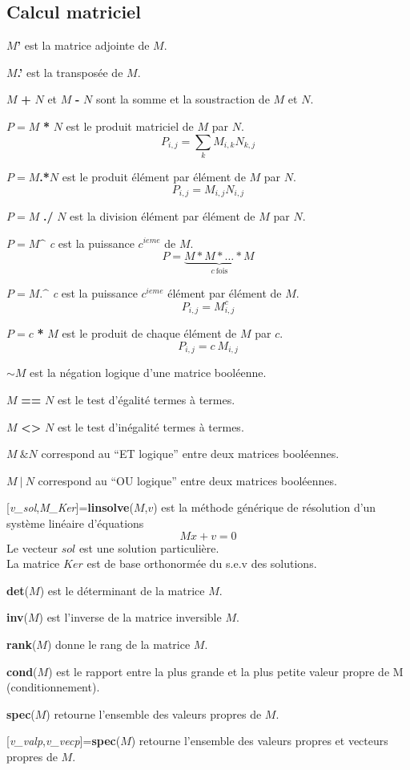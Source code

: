 \documentclass{article}
\begin{document}
\begin{multicols}{3}
\section*{Calcul matriciel}
\begin{description}
\item{$M$\textbf{'}} est la matrice adjointe de $M$.
\item{$M$\textbf{.'}} est la transposée de $M$.
\item{$M$\textbf{ + }$N$ et $M$\textbf{ - }$N$} sont la somme et la soustraction de $M$ et $N$.
\item{$P = M$ \textbf{*} $N$} est le produit matriciel de $M$ par $N$.
$$P_{i,j} =\sum_{k} M_{i,k}N_{k,j}$$
\item{$P = M$\textbf{.*}$N$} est le produit élément par élément de $M$ par $N$.
$$P_{i,j} = M_{i,j} N_{i,j}$$
\item{$P = M$ \textbf{./} $N$} est la division élément par élément de $M$ par $N$.
\item{$P = M$\textbf{$\^$} \textit{c}} est la puissance $c^{ieme}$ de $M$.
$$P = \underbrace{M*M*\ldots*M}_{c~\mbox{fois}}$$
\item{$P = M$\textbf{$.\^$} \textit{c}} est la puissance $c^{ieme}$ élément par élément de $M$.
$$P_{i,j} = M_{i,j}^{c}$$
\item{$P = c$ \textbf{*} $M$} est le produit de chaque élément de $M$ par $c$.
$$P_{i,j} = c ~ M_{i,j}$$
\item{$\mathbf{\sim}M$}  est la négation logique d'une matrice booléenne.
\item{$M$ \textbf{==} $N$}  est le test d'égalité termes à termes.
\item{$M$ \textbf{<>} $N$}  est le test d'inégalité termes à termes.
\item{$M~\mathbf{\&}N$} correspond au ``ET logique'' entre deux matrices booléennes.
\item{$M ~\mathbf{|}~N$} correspond au ``OU logique'' entre deux matrices booléennes.

\item{[\textit{v\_sol},\textit{M\_Ker}]=\textbf{linsolve}($M$,$v$)} est la méthode générique de résolution d'un système linéaire d'équations
$$Mx+v=0$$
Le vecteur $sol$ est une solution particulière.\\
La matrice $Ker$ est de base orthonormée du s.e.v des solutions.
\item{\textbf{det}($M$)} est le déterminant de la matrice $M$.
\item{\textbf{inv}($M$)} est l'inverse de la matrice inversible $M$.
\item{\textbf{rank}($M$)} donne le rang de la matrice $M$.
\item{\textbf{cond}($M$)} est le rapport entre la plus grande et la plus petite valeur propre de M (conditionnement).
\item{\textbf{spec}($M$)} retourne l'ensemble des valeurs propres de $M$.
\item{[\textit{v\_valp},\textit{v\_vecp}]=\textbf{spec}($M$)} retourne l'ensemble des valeurs propres et vecteurs propres de $M$.
 

\end{description}
\end{multicols}
\end{document}
